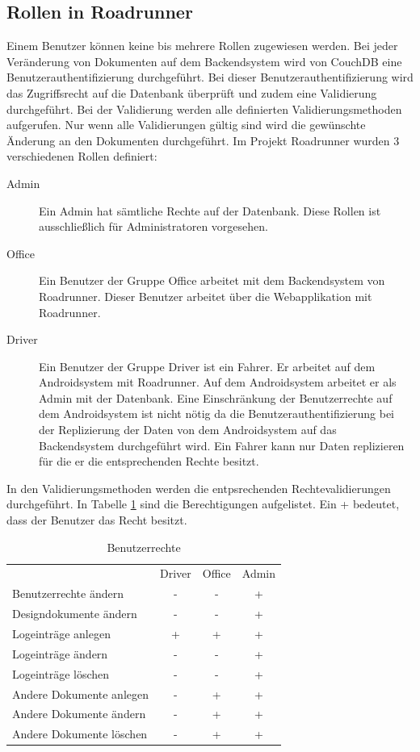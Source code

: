 \subsection{Rollen in Roadrunner}

Einem Benutzer können keine bis mehrere Rollen zugewiesen werden. Bei jeder Veränderung von Dokumenten auf dem Backendsystem wird von CouchDB eine Benutzerauthentifizierung durchgeführt. Bei dieser Benutzerauthentifizierung wird das Zugriffsrecht auf die Datenbank überprüft und zudem eine Validierung durchgeführt. Bei der Validierung werden alle definierten Validierungsmethoden aufgerufen. Nur wenn alle Validierungen gültig sind wird die gewünschte Änderung an den Dokumenten durchgeführt.
\newline \newline \noindent
Im Projekt Roadrunner wurden 3 verschiedenen Rollen definiert:
\begin{description}
\item[Admin] Ein Admin hat sämtliche Rechte auf der Datenbank. Diese Rollen ist ausschließlich für Administratoren vorgesehen.
\item[Office] Ein Benutzer der Gruppe Office arbeitet mit dem Backendsystem von Roadrunner. Dieser Benutzer arbeitet über die Webapplikation mit Roadrunner.
\item[Driver] Ein Benutzer der Gruppe Driver ist ein Fahrer. Er arbeitet auf dem Androidsystem mit Roadrunner. Auf dem Androidsystem arbeitet er als Admin mit der Datenbank. Eine Einschränkung der Benutzerrechte auf dem Androidsystem ist nicht nötig da die Benutzerauthentifizierung bei der Replizierung der Daten von dem Androidsystem auf das Backendsystem durchgeführt wird. Ein Fahrer kann nur Daten replizieren für die er die entsprechenden Rechte besitzt.
\end{description}

\noindent In den Validierungsmethoden werden die entpsrechenden Rechtevalidierungen durchgeführt. In Tabelle \ref{tab:rechte} sind die Berechtigungen aufgelistet. Ein + bedeutet, dass der Benutzer das Recht besitzt.

\begin{table}
\begin{tabular}{lccc}
& Driver & Office & Admin \\
Benutzerrechte ändern & - & - & + \\
Designdokumente ändern & - & - & + \\
Logeinträge anlegen & + & + & + \\
Logeinträge ändern & - & - & + \\
Logeinträge löschen & - & - & + \\
Andere Dokumente anlegen & - & + & + \\
Andere Dokumente ändern & - & + & + \\
Andere Dokumente löschen & - & + & +
\end{tabular}
\caption{Benutzerrechte}
\label{tab:rechte}
\end{table}